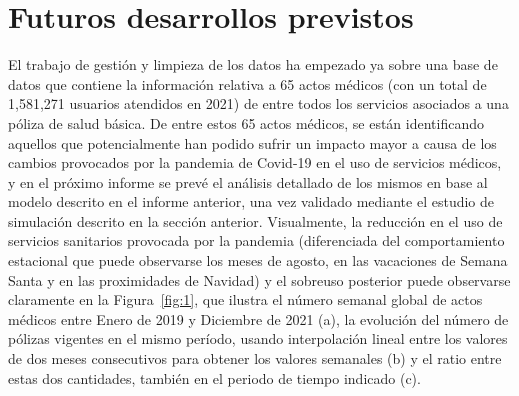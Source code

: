 \documentclass[12pt,twoside]{article} %
\begin{document}
\section{Futuros desarrollos previstos}
El trabajo de gestión y limpieza de los datos ha empezado ya sobre una base de datos que contiene la información relativa a 65 actos médicos (con un total de 1,581,271 usuarios atendidos en 2021) de entre todos los servicios asociados a una póliza de salud básica. De entre estos 65 actos médicos, se están identificando aquellos que potencialmente han podido sufrir un impacto mayor a causa de los cambios provocados por la pandemia de Covid-19 en el uso de servicios médicos, y en el próximo informe se prevé el análisis detallado de los mismos en base al modelo descrito en el informe anterior, una vez validado mediante el estudio de simulación descrito en la sección anterior. Visualmente, la reducción en el uso de servicios sanitarios provocada por la pandemia (diferenciada del comportamiento estacional que puede observarse los meses de agosto, en las vacaciones de Semana Santa y en las proximidades de Navidad) y el sobreuso posterior puede observarse claramente en la Figura~\ref{fig:1}, que ilustra el número semanal global de actos médicos entre Enero de 2019 y Diciembre de 2021 (a), la evolución del número de pólizas vigentes en el mismo período, usando interpolación lineal entre los valores de dos meses consecutivos para obtener los valores semanales (b) y el ratio entre estas dos cantidades, también en el periodo de tiempo indicado (c).

\end{document}
